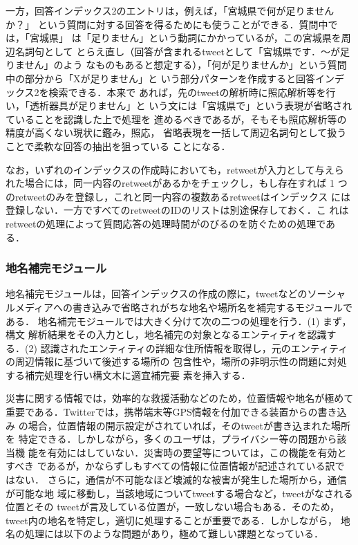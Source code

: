 \documentclass[japanese]{jnlp_1.4}
\begin{document}
一方，回答インデックス2のエントリは，例えば，「宮城県で何が足りませんか？」
という質問に対する回答を得るためにも使うことができる．質問中では，「宮城県」
は「足りません」という動詞にかかっているが，この宮城県を周辺名詞句として
とらえ直し（回答が含まれるtweetとして「宮城県です．〜が足りません」のよう
なものもあると想定する），「何が足りませんか」という質問中の部分から「Xが足りません」と
いう部分パターンを作成すると回答インデックス2を検索できる．本来で
あれば，先のtweetの解析時に照応解析等を行い，「透析器具が足りません」と
いう文には「宮城県で」という表現が省略されていることを認識した上で処理を
進めるべきであるが，そもそも照応解析等の精度が高くない現状に鑑み，照応，
省略表現を一括して周辺名詞句として扱うことで柔軟な回答の抽出を狙っている
ことになる．

なお，いずれのインデックスの作成時においても，retweetが入力として与えら
れた場合には，同一内容のretweetがあるかをチェックし，もし存在すれば
1 つのretweetのみを登録し，これと同一内容の複数あるretweetはインデックス
には登録しない．一方ですべてのretweetのIDのリストは別途保存しておく．こ
れはretweetの処理によって質問応答の処理時間がのびるのを防ぐための処理であ
る．



\subsubsection{地名補完モジュール}
\label{Augment_place}

地名補完モジュールは，回答インデックスの作成の際に，tweetなどのソーシャルメディアへの書き込みで省略されがちな地名や場所名を補完するモジュールである．
地名補完モジュールでは大きく分けて次の二つの処理を行う．(1) まず，構文
解析結果をその入力とし，地名補完の対象となるエンティティを認識する．(2)
認識されたエンティティの詳細な住所情報を取得し，元のエンティティの周辺情報に基づいて後述する場所の
包含性や，場所の非明示性の問題に対処する補完処理を行い構文木に適宜補完要
素を挿入する．

災害に関する情報では，効率的な救援活動などのため，位置情報や地名が極めて
重要である．Twitterでは，携帯端末等GPS情報を付加できる装置からの書き込み
の場合，位置情報の開示設定がされていれば，そのtweetが書き込まれた場所を
特定できる．しかしながら，多くのユーザは，プライバシー等の問題から該当機
能を有効にはしていない．災害時の要望等については，この機能を有効とすべき
であるが，かならずしもすべての情報に位置情報が記述されている訳ではない．
さらに，通信が不可能なほど壊滅的な被害が発生した場所から，通信が可能な地
域に移動し，当該地域についてtweetする場合など，tweetがなされる位置とその
tweetが言及している位置が，一致しない場合もある．そのため，
tweet内の地名を特定し，適切に処理することが重要である．しかしながら，
地名の処理には以下のような問題があり，極めて難しい課題となっている．
\end{document}

